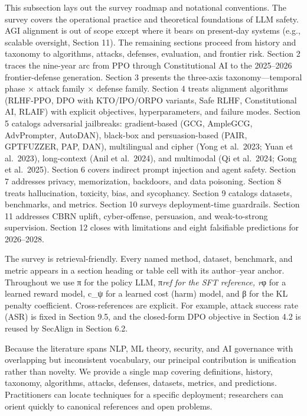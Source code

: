 \documentclass{article}
\begin{document}
This subsection lays out the survey roadmap and notational conventions. The survey covers the operational practice and theoretical foundations of LLM safety. AGI alignment is out of scope except where it bears on present-day systems (e.g., scalable oversight, Section 11). The remaining sections proceed from history and taxonomy to algorithms, attacks, defenses, evaluation, and frontier risk. Section 2 traces the nine-year arc from PPO through Constitutional AI to the 2025--2026 frontier-defense generation. Section 3 presents the three-axis taxonomy---temporal phase × attack family × defense family. Section 4 treats alignment algorithms (RLHF-PPO, DPO with KTO/IPO/ORPO variants, Safe RLHF, Constitutional AI, RLAIF) with explicit objectives, hyperparameters, and failure modes. Section 5 catalogs adversarial jailbreaks: gradient-based (GCG, AmpleGCG, AdvPrompter, AutoDAN), black-box and persuasion-based (PAIR, GPTFUZZER, PAP, DAN), multilingual and cipher (Yong et al.~2023; Yuan et al.~2023), long-context (Anil et al.~2024), and multimodal (Qi et al.~2024; Gong et al.~2025). Section 6 covers indirect prompt injection and agent safety. Section 7 addresses privacy, memorization, backdoors, and data poisoning. Section 8 treats hallucination, toxicity, bias, and sycophancy. Section 9 catalogs datasets, benchmarks, and metrics. Section 10 surveys deployment-time guardrails. Section 11 addresses CBRN uplift, cyber-offense, persuasion, and weak-to-strong supervision. Section 12 closes with limitations and eight falsifiable predictions for 2026--2028.

The survey is retrieval-friendly. Every named method, dataset, benchmark, and metric appears in a section heading or table cell with its author--year anchor. Throughout we use π for the policy LLM, π\emph{ref for the SFT reference, r}φ for a learned reward model, c\_ψ for a learned cost (harm) model, and β for the KL penalty coefficient. Cross-references are explicit. For example, attack success rate (ASR) is fixed in Section 9.5, and the closed-form DPO objective in Section 4.2 is reused by SecAlign in Section 6.2.

Because the literature spans NLP, ML theory, security, and AI governance with overlapping but inconsistent vocabulary, our principal contribution is unification rather than novelty. We provide a single map covering definitions, history, taxonomy, algorithms, attacks, defenses, datasets, metrics, and predictions. Practitioners can locate techniques for a specific deployment; researchers can orient quickly to canonical references and open problems.
\end{document}
